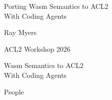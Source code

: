 



{\footlinefalse
\begin{slide}
  \vspace*{12mm}
  \begin{center}\huge Porting Wasm Semantics to ACL2\\With Coding Agents\end{center}
  \vfill
  \noindent\begin{minipage}[b]{.5\textwidth}
    {\Large Ray Myers}\\[1mm]
  \end{minipage}\hfill
  \begin{minipage}[b]{.4\textwidth}
    \raggedleft\large ACL2 Workshop 2026
  \end{minipage}\par
  \vspace*{6mm}
\end{slide}}

{\footlinefalse
\begin{slide}
  \vspace*{12mm}
  \begin{center}\huge\color{muted}%
     Wasm Semantics to ACL2\\With Coding Agents
  \end{center}
  \vspace*{10mm}
  \begin{center}
  \end{center}
  \vfill
\end{slide}}

\begin{slide}[Why?]
\end{slide}

\begin{slide}[Why?]
  \begin{center}\LARGE
    \leavevmode{}\hbox{People}\hskip12mm
    \hskip12mm
  \end{center}
\end{slide}

